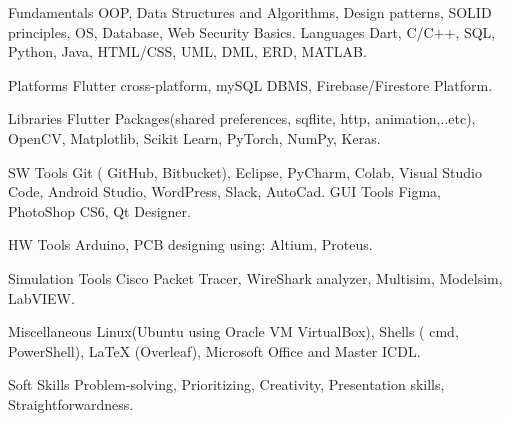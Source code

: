 

\begin{cvskills}

  \cvskill
    {Fundamentals} %
    {OOP, Data Structures and Algorithms, Design patterns, SOLID principles, OS, Database, Web Security Basics.} %
\cvskill
{Languages} %
{ Dart, C/C++, SQL, Python, Java, HTML/CSS, UML, DML, ERD, MATLAB.} %

\cvskill
{Platforms} %
{ Flutter cross-platform, mySQL DBMS, Firebase/Firestore Platform. } %

\cvskill
{Libraries} %
{Flutter Packages(shared preferences, sqflite, http, animation,..etc), OpenCV, Matplotlib, Scikit Learn, PyTorch, NumPy, Keras.} %

\cvskill
{SW Tools} %
{Git ( GitHub, Bitbucket), Eclipse, PyCharm, Colab, Visual Studio Code, Android Studio, WordPress, Slack, AutoCad.} %
\cvskill
{GUI Tools} %
{Figma, PhotoShop CS6, Qt Designer.} %

\cvskill
{HW Tools} %
{Arduino, PCB designing using: Altium, Proteus.} %

\cvskill
{Simulation Tools} %
{Cisco Packet Tracer, WireShark analyzer, Multisim, Modelsim, LabVIEW.} %

  \cvskill
    {Miscellaneous} %
    {Linux(Ubuntu using Oracle VM VirtualBox), Shells ( cmd, PowerShell), LaTeX (Overleaf), Microsoft Office and Master ICDL.} %

  \cvskill
    {Soft Skills} %
    {Problem-solving, Prioritizing, Creativity, Presentation skills, Straightforwardness.} %

\end{cvskills}
